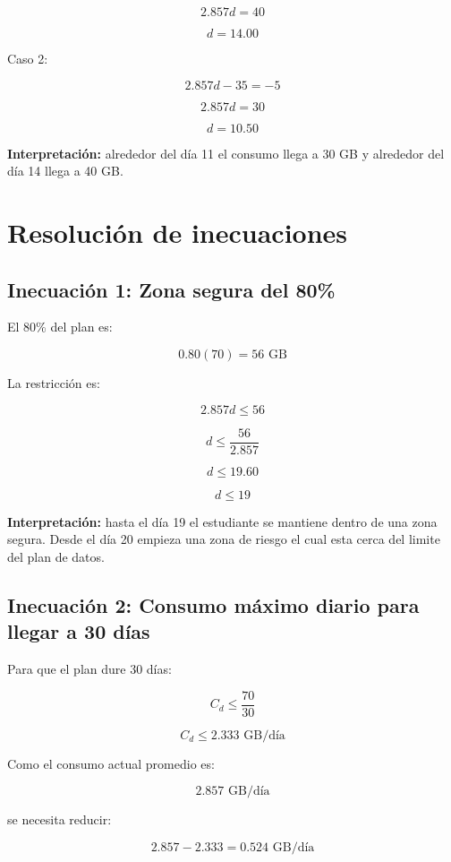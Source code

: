 \documentclass[12pt,a4paper]{article}
\begin{document}
\begin{center}
		\[
		2.857d=40
		\]
		
		\[
		d=14.00
		\]
		
		Caso 2:
		
		\[
		2.857d-35=-5
		\]
		
		\[
		2.857d=30
		\]
		
		\[
		d=10.50
		\]
		
		\textbf{Interpretación:} alrededor del día 11 el consumo llega a 30 GB y alrededor del día 14 llega a 40 GB.
		
		\section{Resolución de inecuaciones}
		
		\subsection{Inecuación 1: Zona segura del 80\%}
		
		El 80\% del plan es:
		
		\[
		0.80(70)=56\text{ GB}
		\]
		
		La restricción es:
		
		\[
		2.857d\leq56
		\]
		
		\[
		d\leq\frac{56}{2.857}
		\]
		
		\[
		d\leq19.60
		\]
		
		\[
		\boxed{d\leq19}
		\]
		
		\textbf{Interpretación:} hasta el día 19 el estudiante se mantiene dentro de una zona segura. Desde el día 20 empieza una zona de riesgo el cual esta cerca del limite del plan de datos.
		
		\subsection{Inecuación 2: Consumo máximo diario para llegar a 30 días}
		
		Para que el plan dure 30 días:
		
		\[
		C_d\leq\frac{70}{30}
		\]
		
		\[
		C_d\leq2.333\text{ GB/día}
		\]
		
		Como el consumo actual promedio es:
		
		\[
		2.857\text{ GB/día}
		\]
		
		se necesita reducir:
		
		\[
		2.857-2.333=0.524\text{ GB/día}
		\]
		

\end{center}
\end{document}
